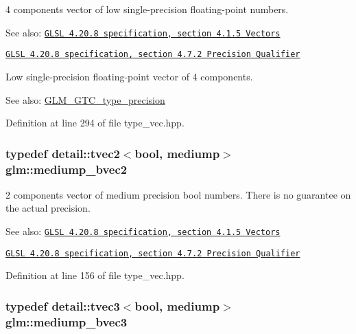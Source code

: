 4 components vector of low single-precision floating-point numbers.

\begin{Desc}
\item[See also:]\href{http://www.opengl.org/registry/doc/GLSLangSpec.4.20.8.pdf}{\tt GLSL 4.20.8 specification, section 4.1.5 Vectors} 

\href{http://www.opengl.org/registry/doc/GLSLangSpec.4.20.8.pdf}{\tt GLSL 4.20.8 specification, section 4.7.2 Precision Qualifier}\end{Desc}
Low single-precision floating-point vector of 4 components. \begin{Desc}
\item[See also:]\hyperlink{group__gtc__type__precision}{GLM\_\-GTC\_\-type\_\-precision} \end{Desc}


Definition at line 294 of file type\_\-vec.hpp.\hypertarget{group__core__precision_g1406d96eb96694d91052d3f882658ab2}{
\subsubsection[mediump\_\-bvec2]{\setlength{\rightskip}{0pt plus 5cm}typedef detail::tvec2$<$bool, mediump$>$ {\bf glm::mediump\_\-bvec2}}}
\label{group__core__precision_g1406d96eb96694d91052d3f882658ab2}


2 components vector of medium precision bool numbers. There is no guarantee on the actual precision.

\begin{Desc}
\item[See also:]\href{http://www.opengl.org/registry/doc/GLSLangSpec.4.20.8.pdf}{\tt GLSL 4.20.8 specification, section 4.1.5 Vectors} 

\href{http://www.opengl.org/registry/doc/GLSLangSpec.4.20.8.pdf}{\tt GLSL 4.20.8 specification, section 4.7.2 Precision Qualifier} \end{Desc}


Definition at line 156 of file type\_\-vec.hpp.\hypertarget{group__core__precision_ge7c8d0136e829d6fe3feb00856e35f11}{
\subsubsection[mediump\_\-bvec3]{\setlength{\rightskip}{0pt plus 5cm}typedef detail::tvec3$<$bool, mediump$>$ {\bf glm::mediump\_\-bvec3}}}
\label{group__core__precision_ge7c8d0136e829d6fe3feb00856e35f11}


